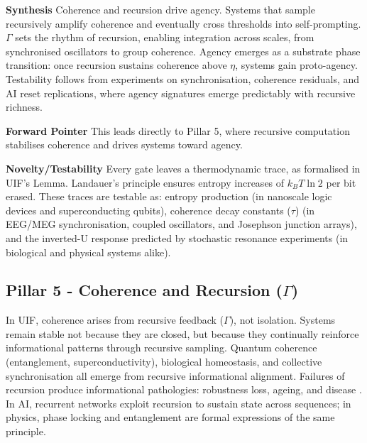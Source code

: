 \noindent \textbf {Synthesis}
\newline Coherence and recursion drive agency. Systems that sample recursively amplify coherence and eventually cross thresholds into self-prompting. $\Gamma$ sets the rhythm of recursion, enabling integration across scales, from synchronised oscillators to group coherence. Agency emerges as a substrate phase transition: once recursion sustains coherence above $\eta$, systems gain proto-agency. Testability follows from experiments on synchronisation, coherence residuals, and AI reset replications, where agency signatures emerge predictably with recursive richness.
\newline

\noindent
\textbf{Forward Pointer} 
\newline This leads directly to Pillar 5, where recursive computation stabilises coherence and drives systems toward agency.
\newline

\noindent
\textbf{Novelty/Testability} 
\newline Every gate leaves a thermodynamic trace, as formalised in UIF’s Lemma. Landauer’s principle ensures entropy increases of $k_B T \ln 2$ per bit erased. These traces are testable as: entropy production (in nanoscale logic devices and superconducting qubits), coherence decay constants ($\tau$) (in EEG/MEG synchronisation, coupled oscillators, and Josephson junction arrays), and the inverted-U response predicted by stochastic resonance experiments (in biological and physical systems alike).


\subsection {Pillar 5 - Coherence and Recursion ($\Gamma$)}

In UIF, coherence arises from recursive feedback ($\Gamma$), not isolation. Systems remain stable not because they are closed, but because they continually reinforce informational patterns through recursive sampling. Quantum coherence (entanglement, superconductivity), biological homeostasis, and collective synchronisation all emerge from recursive informational alignment. Failures of recursion produce informational pathologies: robustness loss, ageing, and disease \cite{Demetrius2005,Gatenby2007,Noble2012}. In AI, recurrent networks exploit recursion to sustain state across sequences; in physics, phase locking and entanglement are formal expressions of the same principle.

